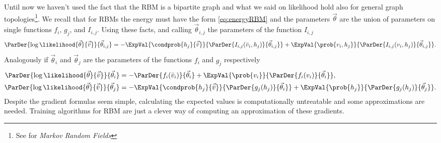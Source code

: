   Until now we haven't used the fact that the RBM is a bipartite graph and what we said on likelihood
  hold also for general graph topologies\footnote{See \cite{fischer2012introduction} for \emph{Markov
  Random Fields}}.
  We recall that for RBMs the energy must have the form \eqref{eq:energyRBM} and the parameters \(\vec{\theta}\) are the union of parameters on single functions \(f_i\), \(g_j\), and \(I_{i,j}\).
  Using these facts, and calling \(\vec{\theta}_{i,j}\) the parameters of the function \(I_{i,j}\)
  \[
    \ParDer{\log\likelihood{\vec{\theta}}{\vec{\bar{v}}}}{\vec{\theta}_{i,j}} 
      = -\ExpVal{\condprob{h_j}{\vec{\bar{v}}}}{\ParDer{I_{i,j}(\bar{v}_i,h_j)}{\vec{\theta}_{i,j}}}
        +\ExpVal{\prob{v_i,h_j}}{\ParDer{I_{i,j}(v_i,h_j)}{\vec{\theta}_{i,j}}}.
  \]
  Analogously if \(\vec{\theta}_i\) and \(\vec{\theta}_j\) are the parameters of the functions
  \(f_i\) and \(g_j\) respectively
  \begin{align*}
    \ParDer{\log\likelihood{\vec{\theta}}{\vec{\bar{v}}}}{\vec{\theta}_i} 
    &= -\ParDer{f_i(\bar{v}_i)}{\vec{\theta}_i}
       +\ExpVal{\prob{v_i}}{\ParDer{f_i(v_i)}{\vec{\theta}_i}}, \\
    \ParDer{\log\likelihood{\vec{\theta}}{\vec{\bar{v}}}}{\vec{\theta}_j} 
    &= -\ExpVal{\condprob{h_j}{\vec{\bar{v}}}}{\ParDer{g_j(h_j)}{\vec{\theta}_i}}
       +\ExpVal{\prob{h_j}}{\ParDer{g_j(h_j)}{\vec{\theta}_j}}.
  \end{align*}
  Despite the gradient formulas seem simple, calculating the expected values is computationally
  untreatable and some approximations are needed. Training algorithms for RBM are just a clever way
  of computing an approximation of these gradients.
  
